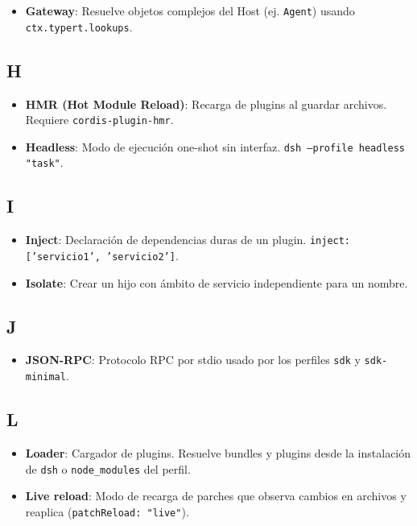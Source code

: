 \documentclass[11pt,a4paper]{article}
\begin{document}
\begin{itemize}[leftmargin=*,topsep=2pt,itemsep=1pt]
  \item \textbf{Gateway}: Resuelve objetos complejos del Host (ej. \texttt{Agent}) usando \texttt{ctx.typert.lookups}.
\end{itemize}


\subsection*{H}


\begin{itemize}[leftmargin=*,topsep=2pt,itemsep=1pt]
  \item \textbf{HMR (Hot Module Reload)}: Recarga de plugins al guardar archivos. Requiere \texttt{cordis-plugin-hmr}.
  \item \textbf{Headless}: Modo de ejecución one-shot sin interfaz. \texttt{dsh --profile headless "task"}.
\end{itemize}


\subsection*{I}


\begin{itemize}[leftmargin=*,topsep=2pt,itemsep=1pt]
  \item \textbf{Inject}: Declaración de dependencias duras de un plugin. \texttt{inject: ['servicio1', 'servicio2']}.
  \item \textbf{Isolate}: Crear un hijo con ámbito de servicio independiente para un nombre.
\end{itemize}


\subsection*{J}


\begin{itemize}[leftmargin=*,topsep=2pt,itemsep=1pt]
  \item \textbf{JSON-RPC}: Protocolo RPC por stdio usado por los perfiles \texttt{sdk} y \texttt{sdk-minimal}.
\end{itemize}


\subsection*{L}


\begin{itemize}[leftmargin=*,topsep=2pt,itemsep=1pt]
  \item \textbf{Loader}: Cargador de plugins. Resuelve bundles y plugins desde la instalación de \texttt{dsh} o \texttt{node\_modules} del perfil.
  \item \textbf{Live reload}: Modo de recarga de parches que observa cambios en archivos y reaplica (\texttt{patchReload: "live"}).
\end{itemize}
\end{document}
